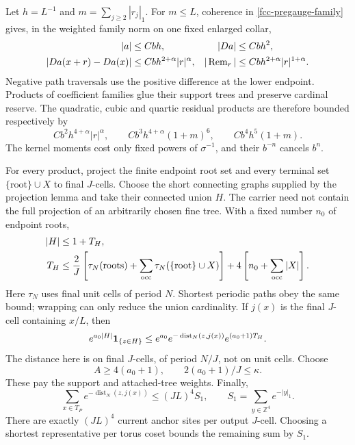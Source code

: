 Let \(h=L^{-1}\) and \(m=\sum_{j\ge2}|r_j|_1\).
For \(m\le L\), coherence in
\eqref{fcc-pregauge-family} gives, in the weighted
family norm on one fixed enlarged collar,
\begin{align}
 |a|&\le Cbh,& |Da|&\le Cbh^2,\notag\\
 |Da(x+r)-Da(x)|&\le Cbh^{2+\alpha}|r|^\alpha,&
 |\operatorname{Rem}_r|&\le
                 Cbh^{2+\alpha}|r|^{1+\alpha}.
 \label{fcc-near-estimates}
\end{align}
Negative path traversals use the positive difference
at the lower endpoint. Products of coefficient families
glue their support trees and preserve cardinal reserve.
The quadratic, cubic and quartic residual products
are therefore bounded respectively by
\[
 Cb^2h^{4+\alpha}|r|^\alpha,\qquad
 Cb^3h^{4+\alpha}(1+m)^6,\qquad
 Cb^4h^5(1+m).
\]
The kernel moments cost only fixed powers of
\(\sigma^{-1}\), and their \(b^{-n}\) cancels \(b^n\).

For every product, project the finite endpoint root
set and every terminal set \(\{\text{root}\}\cup X\)
to final \(J\)-cells. Choose the short connecting
graphs supplied by the projection lemma and take
their connected union \(H\). The carrier need not
contain the full projection of an arbitrarily chosen
fine tree. With a fixed number \(n_0\) of endpoint
roots,
\begin{align}
 |H|&\le1+T_H,\notag\\
 T_H&\le\frac2J\left[
          \tau_N(\text{roots})
           +\sum_{\rm occ}\tau_N(\{\text{root}\}\cup X)\right]
             +4\left[n_0+\sum_{\rm occ}|X|\right].
 \label{fcc-carrier-geometry}
\end{align}
Here \(\tau_N\) uses final unit cells of period \(N\).
Shortest periodic paths obey the same bound; wrapping
can only reduce the union cardinality. If \(j(x)\)
is the final \(J\)-cell containing \(x/L\), then
\begin{equation}
 e^{a_0|H|}{\bf1}_{\{z\in H\}}
 \le e^{a_0}e^{-\operatorname{dist}_N(z,j(x))}
                         e^{(a_0+1)T_H}.
 \label{fcc-reroot}
\end{equation}
The distance here is on final \(J\)-cells, of period
\(N/J\), not on unit cells. Choose
\begin{equation}
 A\ge4(a_0+1),\qquad 2(a_0+1)/J\le\kappa.
 \label{fcc-reserve}
\end{equation}
These pay the support and attached-tree weights.
Finally,
\begin{equation}
 \sum_{x\in T_P}e^{-\operatorname{dist}_N(z,j(x))}
       \le(JL)^4 S_1,\qquad
 S_1=\sum_{y\in\mathbb Z^4}e^{-|y|_1}.
 \label{fcc-anchor-count}
\end{equation}
There are exactly \((JL)^4\) current anchor sites per
output \(J\)-cell. Choosing a shortest representative
per torus coset bounds the remaining sum by \(S_1\).

